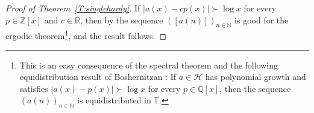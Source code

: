 \documentclass[11pt]{amsart}
\renewcommand{\H}{\mathcal{H}}
\newcommand{\T}{\mathbb{T}}
\newcommand{\Q}{\mathbb{Q}}
\newcommand{\R}{\mathbb{R}}
\newcommand{\N}{\mathbb{N}}
\newcommand{\Z}{\mathbb{Z}}
\theoremstyle{plain}
\theoremstyle{definition}
\theoremstyle{remark}
\begin{document}
\begin{proof}[Proof of Theorem~\ref{T:singlehardy}]

  If $|a(x)-c p(x)|\succ \log x$ for every $p\in \Z[x]$ and
  $c\in \R$, then by \cite{BKQW} the sequence $([a(n)])_{n\in\N}$
  is good for the ergodic theorem\footnote{This is an easy consequence of the spectral
    theorem and the following equidistribution result of Boshernitzan
    \cite{Bo3}: If $a\in \H$ has  polynomial growth and
    satisfies $|a(x)-p(x)|\succ\log x$ for every $p\in\Q[x]$, then the
    sequence $(a(n))_{n\in\N}$ is equidistributed in $\T$.},  and the
  result follows.



\end{proof}
\end{document}

